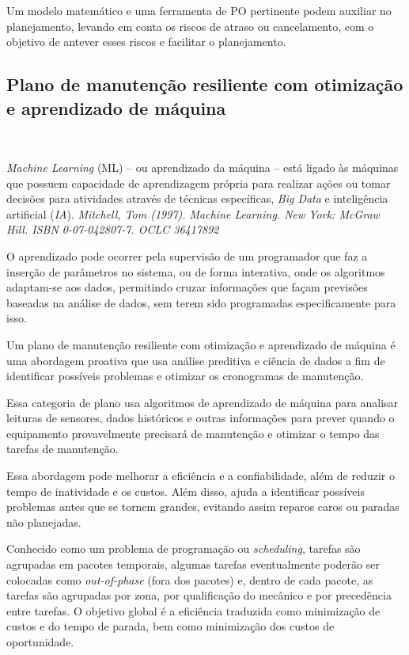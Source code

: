 \documentclass{amsart}
\begin{document}
Um modelo matemático e uma ferramenta de PO pertinente podem auxiliar no planejamento, levando em conta os riscos de atraso ou cancelamento, com o objetivo de antever esses riscos e facilitar o planejamento.

\subsection{Plano de manutenção resiliente com otimização e aprendizado de máquina}\

{\it Machine Learning} (ML) – ou aprendizado da máquina – está ligado às máquinas que possuem capacidade de aprendizagem própria para realizar ações ou tomar decisões para atividades através de técnicas específicas, {\it Big Data} e inteligência artificial ({\it IA}). {\it Mitchell, Tom (1997). Machine Learning. New York: McGraw Hill. ISBN 0-07-042807-7. OCLC 36417892}  

O aprendizado pode ocorrer pela supervisão de um programador que faz a inserção de parâmetros no sistema, ou de forma interativa, onde os algoritmos adaptam-se aos dados, permitindo cruzar informações que façam previsões baseadas na análise de dados, sem terem sido programadas especificamente para isso.

Um plano de manutenção resiliente com otimização e aprendizado de máquina é uma abordagem proativa que usa análise preditiva e ciência de dados a fim de identificar possíveis problemas e otimizar os cronogramas de manutenção.

Essa categoria de plano usa algoritmos de aprendizado de máquina para analisar leituras de sensores, dados históricos e outras informações para prever quando o equipamento provavelmente precisará de manutenção e otimizar o tempo das tarefas de manutenção.

Essa abordagem pode melhorar a eficiência e a confiabilidade, além de reduzir o tempo de inatividade e os custos. Além disso, ajuda a identificar possíveis problemas antes que se tornem grandes, evitando assim reparos caros ou paradas não planejadas.

Conhecido como um problema de programação ou {\it scheduling}, tarefas são agrupadas em pacotes temporais, algumas tarefas eventualmente poderão ser colocadas como {\it out-of-phase} (fora dos pacotes) e, dentro de cada pacote, as tarefas são agrupadas por zona, por qualificação do mecânico e por precedência entre tarefas.
O objetivo global é a eficiência traduzida como minimização de custos e do tempo de parada, bem como minimização dos custos de oportunidade.
\end{document}
